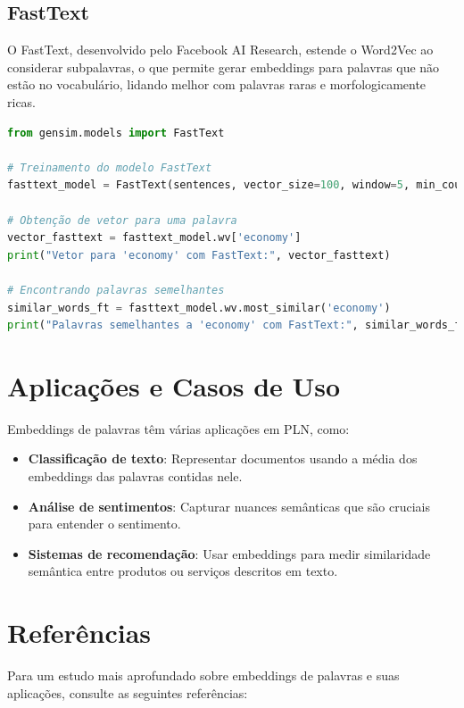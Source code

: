 \documentclass[14pt,a4paper,oneside]{book}
\begin{document}
\subsection{FastText}
O FastText, desenvolvido pelo Facebook AI Research, estende o Word2Vec ao considerar subpalavras, o que permite gerar embeddings para palavras que não estão no vocabulário, lidando melhor com palavras raras e morfologicamente ricas.

\begin{lstlisting}[language=Python]
from gensim.models import FastText

# Treinamento do modelo FastText
fasttext_model = FastText(sentences, vector_size=100, window=5, min_count=5)

# Obtenção de vetor para uma palavra
vector_fasttext = fasttext_model.wv['economy']
print("Vetor para 'economy' com FastText:", vector_fasttext)

# Encontrando palavras semelhantes
similar_words_ft = fasttext_model.wv.most_similar('economy')
print("Palavras semelhantes a 'economy' com FastText:", similar_words_ft)
\end{lstlisting}

\section{Aplicações e Casos de Uso}

Embeddings de palavras têm várias aplicações em PLN, como:

\begin{itemize}
	\item \textbf{Classificação de texto}: Representar documentos usando a média dos embeddings das palavras contidas nele.
	\item \textbf{Análise de sentimentos}: Capturar nuances semânticas que são cruciais para entender o sentimento.
	\item \textbf{Sistemas de recomendação}: Usar embeddings para medir similaridade semântica entre produtos ou serviços descritos em texto.
\end{itemize}

\section{Referências}
Para um estudo mais aprofundado sobre embeddings de palavras e suas aplicações, consulte as seguintes referências:
\end{document}
